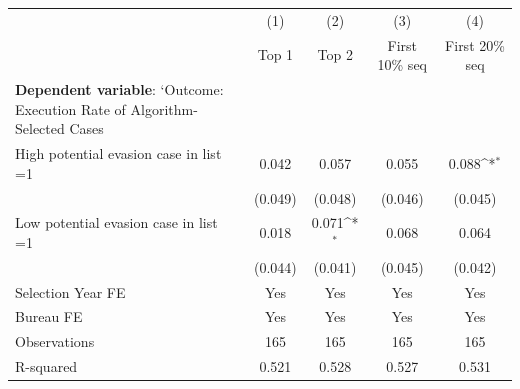 {
\def\sym#1{\ifmmode^{#1}\else\(^{#1}\)\fi}
\begin{tabular}{l*{4}{c}}
\toprule
            &\multicolumn{1}{c}{(1)}&\multicolumn{1}{c}{(2)}&\multicolumn{1}{c}{(3)}&\multicolumn{1}{c}{(4)}\\
            &\multicolumn{1}{c}{Top 1}&\multicolumn{1}{c}{Top 2}&\multicolumn{1}{c}{First 10\% seq}&\multicolumn{1}{c}{First 20\% seq}\\
\midrule
\textbf{Dependent variable}: `Outcome: Execution Rate of Algorithm-Selected Cases&                     &                     &                     &                     \\
\addlinespace
High potential evasion case in list =1&       0.042         &       0.057         &       0.055         &       0.088\sym{*}  \\
            &     (0.049)         &     (0.048)         &     (0.046)         &     (0.045)         \\
\addlinespace
Low potential evasion case in list =1&       0.018         &       0.071\sym{*}  &       0.068         &       0.064         \\
            &     (0.044)         &     (0.041)         &     (0.045)         &     (0.042)         \\
\midrule
Selection Year FE&         Yes         &         Yes         &         Yes         &         Yes         \\
Bureau FE   &         Yes         &         Yes         &         Yes         &         Yes         \\
Observations&         165         &         165         &         165         &         165         \\
R-squared   &       0.521         &       0.528         &       0.527         &       0.531         \\
\bottomrule
\end{tabular}
}
